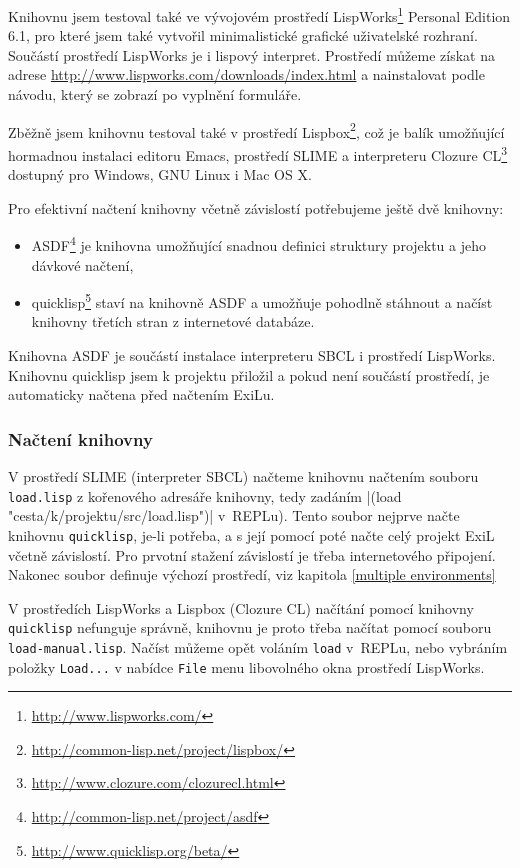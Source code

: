 Knihovnu jsem testoval také ve vývojovém prostředí
LispWorks\texttrademark\footnote{\url{http://www.lispworks.com/}} Personal Edition
6.1, pro které jsem také vytvořil minimalistické grafické uživatelské rozhraní.
Součástí prostředí LispWorks je i lispový interpret. Prostředí můžeme získat na
adrese \url{http://www.lispworks.com/downloads/index.html} a nainstalovat podle
návodu, který se zobrazí po vyplnění formuláře.

Zběžně jsem knihovnu testoval také v prostředí
Lispbox\footnote{\url{http://common-lisp.net/project/lispbox/}}, což je balík
umožňující hormadnou instalaci editoru Emacs, prostředí SLIME a interpreteru
Clozure CL\footnote{\url{http://www.clozure.com/clozurecl.html}} dostupný pro
Windows, GNU Linux i Mac OS X.

Pro efektivní načtení knihovny včetně závislostí potřebujeme ještě dvě knihovny:
\begin{itemize}
  \item ASDF\footnote{\url{http://common-lisp.net/project/asdf}} je knihovna
    umožňující snadnou definici struktury projektu a jeho dávkové načtení,
  \item quicklisp\footnote{\url{http://www.quicklisp.org/beta/}} staví na knihovně
    ASDF a umožňuje pohodlně stáhnout a načíst knihovny třetích stran z internetové
    databáze.
\end{itemize}
Knihovna ASDF je součástí instalace interpreteru SBCL i prostředí LispWorks.
Knihovnu quicklisp jsem k projektu přiložil a pokud není součástí prostředí, je
automaticky načtena před načtením ExiLu.
\subsubsection{Načtení knihovny}
V prostředí SLIME (interpreter SBCL) načteme knihovnu načtením souboru
\verb|load.lisp| z kořenového adresáře knihovny, tedy zadáním
\cl|(load "cesta/k/projektu/src/load.lisp")| v~REPLu). Tento soubor nejprve
načte knihovnu \verb|quicklisp|, je-li potřeba, a s její pomocí poté načte celý
projekt ExiL včetně závislostí. Pro prvotní stažení závislostí je třeba
internetového připojení. Nakonec soubor definuje výchozí prostředí, viz kapitola
\ref{multiple environments}

V prostředích LispWorks a Lispbox (Clozure CL) načítání pomocí knihovny
\verb|quicklisp| nefunguje správně, knihovnu je proto třeba načítat pomocí
souboru \verb|load-manual.lisp|. Načíst můžeme opět voláním \verb|load| v~REPLu,
nebo vybráním položky \verb|Load...| v nabídce \verb|File| menu libovolného okna
prostředí LispWorks.

